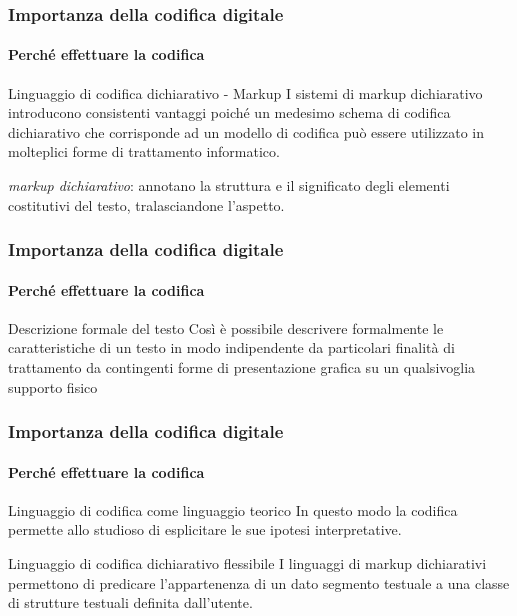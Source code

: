 \begin{frame}
	\frametitle{Importanza della codifica digitale}
	\framesubtitle{Perché effettuare la codifica}
	\addtocounter{nframe}{1}

	\begin{block}{Linguaggio di codifica dichiarativo - Markup}
		I sistemi di markup dichiarativo introducono consistenti vantaggi poiché un medesimo schema di codifica dichiarativo che corrisponde ad un modello di codifica può essere utilizzato in molteplici forme di trattamento informatico.
	\end{block}

	\textit{markup dichiarativo}: annotano la struttura e il significato degli elementi costitutivi del testo, tralasciandone l’aspetto.

\end{frame}

\begin{frame}
	\frametitle{Importanza della codifica digitale}
	\framesubtitle{Perché effettuare la codifica}
	\addtocounter{nframe}{1}

	\begin{block}{Descrizione formale del testo}
		Così è possibile descrivere formalmente le caratteristiche di un testo in modo indipendente da particolari finalità di trattamento da contingenti forme di presentazione grafica su un qualsivoglia supporto fisico
	\end{block}

\end{frame}


\begin{frame}
	\frametitle{Importanza della codifica digitale}
	\framesubtitle{Perché effettuare la codifica}
	\addtocounter{nframe}{1}

	\begin{block}{Linguaggio di codifica come linguaggio teorico}
		In questo modo la codifica permette allo studioso di esplicitare le sue ipotesi interpretative.
	\end{block}

	\begin{block}{Linguaggio di codifica dichiarativo flessibile}
		I linguaggi di markup dichiarativi permettono di predicare l’appartenenza di un dato segmento testuale a una classe di strutture testuali definita dall’utente.
	\end{block}

\end{frame}


